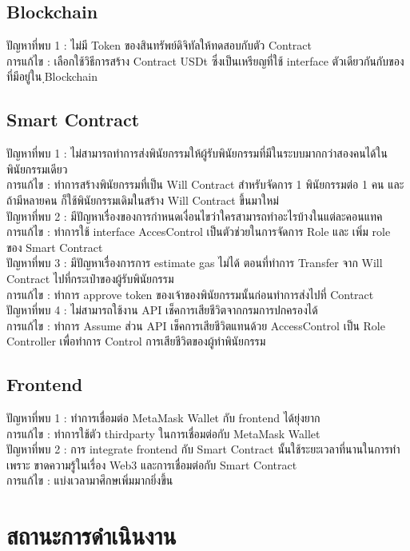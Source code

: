 \documentclass[12pt,oneside,openright,a4paper]{cpe-thai-project}
\begin{document}
\subsection{Blockchain}
\tab ปัญหาที่พบ 1 : ไม่มี Token ของสินทรัพย์ดิจิทัลให้ทดสอบกับตัว Contract \\
\tab การแก้ไข : เลือกใช้วิธีการสร้าง Contract USDt ซึ่งเป็นเหรียญที่ใช้ interface ตัวเดียวกันกับของที่มีอยู่ใน ฺBlockchain
\subsection{Smart Contract}
\tab ปัญหาที่พบ 1 : ไม่สามารถทำการส่งพินัยกรรมให้ผู้รับพินัยกรรมที่มีในระบบมากกว่าสองคนได้ใน พินัยกรรมเดียว\\
\tab การแก้ไข : ทำการสร้างพินัยกรรมที่เป็น Will Contract สำหรับจัดการ 1 พินัยกรรมต่อ 1 คน และถ้ามีหลายคน ก็ใช้พินัยกรรมเดิมในสร้าง Will Contract ขึ้นมาใหม่\\
\tab ปัญหาที่พบ 2 : มีปัญหาเรื่องของการกำหนดเงื่อนไขว่าใครสามารถทำอะไรบ้างในแต่ละคอนแทค\\
\tab การแก้ไข : ทำการใช้ interface AccesControl เป็นตัวช่วยในการจัดการ Role และ เพิ่ม role ของ Smart Contract\\
\tab ปัญหาที่พบ 3 : มีปัญหาเรื่องการการ estimate gas ไม่ได้ ตอนที่ทำการ Transfer จาก Will Contract ไปที่กระเป๋าของผู้รับพินัยกรรม\\
\tab การแก้ไข : ทำการ approve token ของเจ้าของพินัยกรรมนั้นก่อนทำการส่งไปที่ Contract\\
\tab ปัญหาที่พบ 4 : ไม่สามารถใช้งาน API เช็คการเสียชีวิตจากกรมการปกครองได้\\
\tab การแก้ไข : ทำการ Assume ส่วน API เช็คการเสียชีวิตแทนด้วย AccessControl เป็น Role Controller เพื่อทำการ Control การเสียชีวิตของผู้ทำพินัยกรรม
\subsection{Frontend}
\tab ปัญหาที่พบ 1 : ทำการเชื่อมต่อ MetaMask Wallet กับ frontend ได้ยุ่งยาก\\
\tab การแก้ไข : ทำการใช้ตัว thirdparty ในการเชื่อมต่อกับ MetaMask Wallet\\
\tab ปัญหาที่พบ 2 : การ integrate frontend กับ Smart Contract นั้นใช้ระยะเวลาที่นานในการทำ เพราะ ขาดความรู้ในเรื่อง Web3 และการเชื่อมต่อกับ Smart Contract\\
\tab การแก้ไข : แบ่งเวลามาศึกษเพิ่มมากยิ่งขึ้น\\
\section{สถานะการดำเนินงาน}
\end{document}
